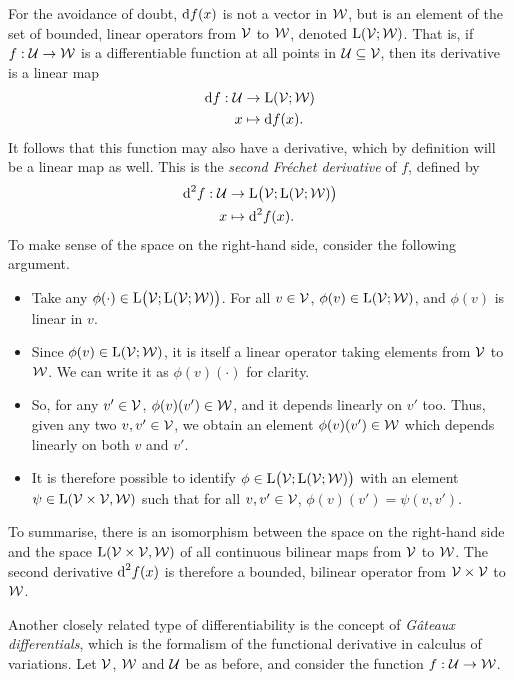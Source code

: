 For the avoidance of doubt, $\text{d} f(x)$ is not a vector in ${\mathcal W}$, but is an element of the set of bounded, linear operators from ${\mathcal V}$ to ${\mathcal W}$, denoted $\text{L}({\mathcal V};{\mathcal W})$.
That is, if $f:{\mathcal U}\to{\mathcal W}$ is a differentiable function at all points in ${\mathcal U}\subseteq{\mathcal V}$, then its derivative is a linear map
\begin{align*}
  \text{d} f: {\mathcal U} &\to \text{L}({\mathcal V};{\mathcal W}) \\
  x &\mapsto \text{d} f(x).
\end{align*}
It follows that this function may also have a derivative, which by definition will be a linear map as well.
This is the \emph{second Fréchet derivative} of $f$, defined by
\begin{align*}
  \text{d}^2 f: {\mathcal U} &\to \text{L}\big({\mathcal V};\text{L}({\mathcal V};{\mathcal W})\big) \\
  x &\mapsto \text{d}^2f(x).
\end{align*}
To make sense of the space on the right-hand side, consider the following argument.
\begin{itemize}
  \item Take any $\phi(\cdot) \in \text{L}\big({\mathcal V};\text{L}({\mathcal V};{\mathcal W})\big)$. For all $v\in{\mathcal V}$, $\phi(v)\in\text{L}({\mathcal V};{\mathcal W})$, and $\phi(v)$ is linear in $v$.
  \item Since $\phi(v)\in\text{L}({\mathcal V};{\mathcal W})$, it is itself a linear operator taking elements from ${\mathcal V}$ to ${\mathcal W}$. We can write it as $\phi(v)(\cdot)$ for clarity.
  \item So, for any $v'\in{\mathcal V}$, $\phi(v)(v')\in{\mathcal W}$, and it depends linearly on $v'$ too. Thus, given any two $v,v'\in{\mathcal V}$, we obtain an element $\phi(v)(v')\in{\mathcal W}$ which depends linearly on both $v$ and $v'$.
  \item It is therefore possible to identify $\phi \in \text{L}\big({\mathcal V};\text{L}({\mathcal V};{\mathcal W})\big)$ with an element $\psi \in \text{L}({\mathcal V} \times {\mathcal V}, {\mathcal W})$ such that for all $v,v'\in{\mathcal V}$, $\phi(v)(v') = \psi(v,v')$.
\end{itemize}
To summarise, there is an isomorphism between the space on the right-hand side and the space $\text{L}({\mathcal V} \times {\mathcal V}, {\mathcal W})$ of all continuous bilinear maps from ${\mathcal V}$ to ${\mathcal W}$.
The second derivative $\text{d}^2 f(x)$ is therefore a bounded, bilinear operator from ${\mathcal V}\times{\mathcal V}$ to ${\mathcal W}$.

Another closely related type of differentiability is the concept of \emph{Gâteaux differentials}, which is the formalism of the functional derivative in calculus of variations.
Let ${\mathcal V}$, ${\mathcal W}$ and ${\mathcal U}$ be as before, and consider the function $f:{\mathcal U}\to{\mathcal W}$.

